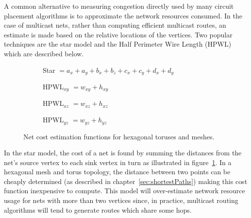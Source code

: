 				A common alternative to measuring congestion directly used by many
				circuit placement algorithms is to approximate the network resources
				consumed. In the case of multicast nets, rather than computing
				efficient multicast routes, an estimate is made based on the relative
				locations of the vertices. Two popular techniques are the star model
				and the Half Perimeter Wire Length (HPWL) \cite{kahng11} which are
				described below.
				
				\begin{figure}
					\center
					\begin{subfigure}[b]{\linewidth}
						\center
						
						\caption{Star $= a_x + a_y + b_x + b_z + c_x + c_y + d_x + d_y$}
						\label{fig:cost-function-star}
					\end{subfigure}
					
					\vspace*{1.5em}
					
					\begin{subfigure}[b]{0.32\linewidth}
						\center
						
						\caption{HPWL$_{xy}$ $= w_{xy} + h_{xy}$}
						\label{fig:cost-function-hpwl-xy}
					\end{subfigure}
					\begin{subfigure}[b]{0.32\linewidth}
						\center
						
						\caption{HPWL$_{xz}$ $= w_{xz} + h_{xz}$}
						\label{fig:cost-function-hpwl-xz}
					\end{subfigure}
					\begin{subfigure}[b]{0.32\linewidth}
						\center
						
						\caption{HPWL$_{yz}$ $= w_{yz} + h_{yz}$}
						\label{fig:cost-function-hpwl-yz}
					\end{subfigure}
					
					\caption[Net cost estimation functions for hexagonal toruses.]%
					{Net cost estimation functions for hexagonal toruses and meshes.}
					\label{fig:cost-function}
				\end{figure}
				
				In the star model, the cost of a net is found by summing the distances
				from the net's source vertex to each sink vertex in turn as illustrated
				in figure~\ref{fig:cost-function-star}. In a hexagonal mesh and torus
				topology, the distance between two points can be cheaply determined (as
				described in chapter~\ref{sec:shortestPaths}) making this cost function
				inexpensive to compute. This model will over-estimate network resource
				usage for nets with more than two vertices since, in practice,
				multicast routing algorithms will tend to generate routes which share
				some hops.
				
